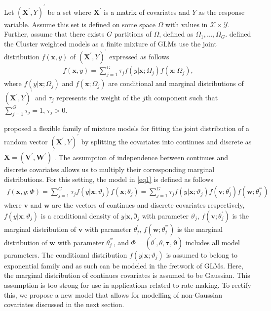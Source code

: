 \documentclass[11pt,letterpaper]{article}
\numberwithin{equation}{section}
\numberwithin{equation}{section}
\numberwithin{equation}{section}
\begin{document}
Let $(\bm{X^{'}}, Y)^{'}$ be a set where $\bm{X^{'}}$ is a matrix of covariates and $Y$ as the response variable. Assume this set is defined on some space $\Omega$ with values in $ \mathcal{X} \times \mathcal{Y}$. Further, assume that there exists $G$ partitions of $\Omega$, defined as $\Omega_1, \ldots, \Omega_G$.  \cite{Gershenfeld:1997} defined the Cluster weighted models as a finite mixture of GLMs use the joint distribution $f(\bm x, y)$ of $(\bm{X^{'}}, Y )^{'}$  expressed as follows
 \begin{align}
 f(\bm x, y)= \sum_{j=1}^{G} \tau_j f(y|\bm{x};\Omega_j)f(\bm{x};\Omega_j),
\label{eq1}
\end{align}
\flushleft where $f(y|\bm{x};\Omega_j)$ and $f(\bm{x};\Omega_j)$ are conditional and marginal distributions of $(\bm{X^{'}}, Y)^{'}$ and $\tau_j$ represents the weight of the $j$th component such that $\sum_{j=1}^{G}\tau_j=1$, $\tau_j>0$.

\cite{Ingrassia+Punzo+Vittadini+Minotti:2015} proposed a flexible family of mixture models for fitting the joint distribution of a random vector $(\bm{X^{'}}, Y)^{'}$ by splitting the covariates into continues and discrete as $ \bm{X}=(\bm{V^{'}},  \bm{W^{'}})^{'}$. The assumption of independence between continues and discrete covariates allows us to multiply their corresponding marginal distributions. For this setting, the model in \eqref{eq1} is defined as follows
\begin{align}
 f(\bm x, y; \Phi)= \sum_{j=1}^{G} \tau_j f(y|\bm{x};\vartheta_j)f(\bm{x};\theta_j)=\sum_{j=1}^{G} \tau_j f(y|\bm{x};\vartheta_j)f(\bm{v};\theta_j^{'})f(\bm{w};\theta_j^{'''})
\label{eq2}
\end{align}
where $\bm{v}$ and $\bm{w}$ are the vectors of continues and discrete covariates respectively, $f(y|\bm{x};\vartheta_j)$ is a conditional density of $y|\bm{x},\Im_j$ with parameter $\vartheta_j$, $f(\bm{v};\theta_j^{'})$ is the marginal distribution of $\bm{v}$ with parameter $\theta_j^{'}$, $f(\bm{w};\theta_j^{'''})$ is the marginal distribution of $\bm{w}$ with parameter $\theta_j^{'''}$, and $\Phi=(\theta^{'}, \theta, \bm{\tau}, \bm{\vartheta})$ includes all model parameters. %
The conditional distribution $f(y|\bm{x};\vartheta_j)$ is assumed to belong to exponential family and as such can be modeled in the fretwork of GLMs. Here, the marginal distribution of continues covariates is assumed to be Gaussian. This assumption is too strong for use in applications related to rate-making. To rectify this, we propose a new model that allows for modelling of non-Gaussian covariates  discussed in the next section.
\end{document}
